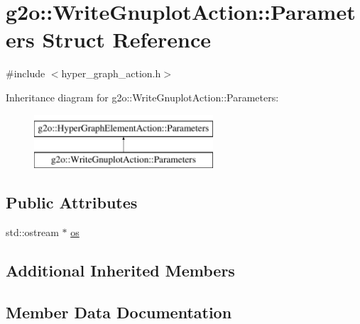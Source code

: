 \hypertarget{structg2o_1_1_write_gnuplot_action_1_1_parameters}{}\section{g2o\+:\+:Write\+Gnuplot\+Action\+:\+:Parameters Struct Reference}
\label{structg2o_1_1_write_gnuplot_action_1_1_parameters}


{\ttfamily \#include $<$hyper\+\_\+graph\+\_\+action.\+h$>$}

Inheritance diagram for g2o\+:\+:Write\+Gnuplot\+Action\+:\+:Parameters\+:\begin{figure}[H]
\begin{center}
\leavevmode
\includegraphics[height=2.000000cm]{structg2o_1_1_write_gnuplot_action_1_1_parameters}
\end{center}
\end{figure}
\subsection*{Public Attributes}
\begin{DoxyCompactItemize}
\item 
std\+::ostream $\ast$ \mbox{\hyperlink{structg2o_1_1_write_gnuplot_action_1_1_parameters_a8e25b8cffdc008929a939cf9080c5902}{os}}
\end{DoxyCompactItemize}
\subsection*{Additional Inherited Members}


\subsection{Member Data Documentation}
\mbox{\label{structg2o_1_1_write_gnuplot_action_1_1_parameters_a8e25b8cffdc008929a939cf9080c5902}} 

